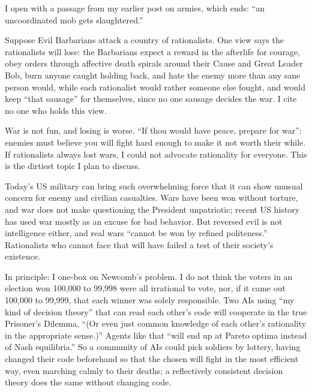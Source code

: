 
I open with a passage from my earlier post on armies, which ends: ``an uncoordinated mob gets slaughtered.''

Suppose Evil Barbarians attack a country of rationalists. One view says the rationalists will lose: the Barbarians expect a reward in the afterlife for courage, obey orders through affective death spirals around their Cause and Great Leader Bob, burn anyone caught holding back, and hate the enemy more than any sane person would, while each rationalist would rather someone else fought, and would keep ``that sausage'' for themselves, since no one sausage decides the war. I cite no one who holds this view. 

War is not fun, and losing is worse. ``If thou would have peace, prepare for war'': enemies must believe you will fight hard enough to make it not worth their while. If rationalists always lost wars, I could not advocate rationality for everyone. This is the dirtiest topic I plan to discuss.

Today's US military can bring such overwhelming force that it can show unusual concern for enemy and civilian casualties. Wars have been won without torture, and war does not make questioning the President unpatriotic; recent US history has used war mostly as an excuse for bad behavior. But reversed evil is not intelligence either, and real wars ``cannot be won by refined politeness.'' Rationalists who cannot face that will have failed a test of their society's existence.

In principle: I one-box on Newcomb's problem. I do not think the voters in an election won 100,000 to 99,998 were all irrational to vote, nor, if it came out 100,000 to 99,999, that each winner was solely responsible. Two AIs using ``my kind of decision theory'' that can read each other's code will cooperate in the true Prisoner's Dilemma, ``(Or even just common knowledge of each other's rationality in the appropriate sense.)''  Agents like that ``will end up at Pareto optima instead of Nash equilibria.''  So a community of AIs could pick soldiers by lottery, having changed their code beforehand so that the chosen will fight in the most efficient way, even marching calmly to their deaths; a reflectively consistent decision theory does the same without changing code.

